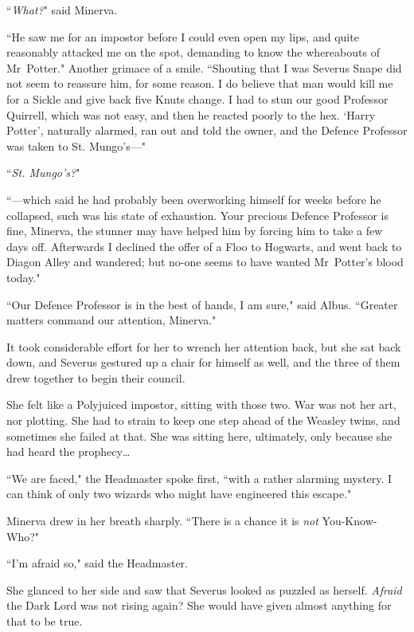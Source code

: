 ``\emph{What?}" said Minerva.

``He saw me for an impostor before I could even open my lips, and quite reasonably attacked me on the spot, demanding to know the whereabouts of Mr~Potter." Another grimace of a smile. ``Shouting that I was Severus Snape did not seem to reassure him, for some reason. I do believe that man would kill me for a Sickle and give back five Knuts change. I had to stun our good Professor Quirrell, which was not easy, and then he reacted poorly to the hex. `Harry Potter', naturally alarmed, ran out and told the owner, and the Defence Professor was taken to St. Mungo's—"

``\emph{St. Mungo's?}"

``—which said he had probably been overworking himself for weeks before he collapsed, such was his state of exhaustion. Your precious Defence Professor is fine, Minerva, the stunner may have helped him by forcing him to take a few days off. Afterwards I declined the offer of a Floo to Hogwarts, and went back to Diagon Alley and wandered; but no-one seems to have wanted Mr~Potter's blood today."

``Our Defence Professor is in the best of hands, I am sure," said Albus. ``Greater matters command our attention, Minerva."

It took considerable effort for her to wrench her attention back, but she sat back down, and Severus gestured up a chair for himself as well, and the three of them drew together to begin their council.

She felt like a Polyjuiced impostor, sitting with those two. War was not her art, nor plotting. She had to strain to keep one step ahead of the Weasley twins, and sometimes she failed at that. She was sitting here, ultimately, only because she had heard the prophecy…

``We are faced," the Headmaster spoke first, ``with a rather alarming mystery. I can think of only two wizards who might have engineered this escape."

Minerva drew in her breath sharply. ``There is a chance it is \emph{not} You-Know-Who?"

``I'm afraid so," said the Headmaster.

She glanced to her side and saw that Severus looked as puzzled as herself. \emph{Afraid} the Dark Lord was not rising again? She would have given almost anything for that to be true.

